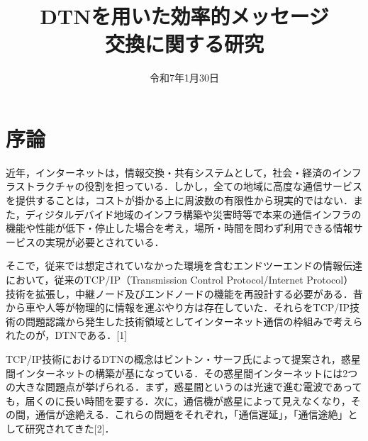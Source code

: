 \documentclass[11pt]{icsthesis}
\title{DTNを用いた効率的メッセージ\\交換に関する研究}
\date{令和7年1月30日}
\begin{document}
\maketitle
\pagestyle{fancy}
\fancyhead[R]{\nouppercase{\fontsize{10.5pt}{0pt}\selectfont\rightmark}}
\fancyhead[L]{\nouppercase{\fontsize{10.5pt}{0pt}\selectfont\leftmark}}
\fancyfoot[C]{--\ \thepage\ --}
\renewcommand{\headrulewidth}{0.3truemm}
\setcounter{tocdepth}{4}
\pagestyle{fancy}
\fancyfoot[C]{--\ \thepage\ --}
{\makeatletter
\let\ps@jpl@in\ps@empty
\makeatother
\pagestyle{plain}
\tableofcontents
\clearpage}

\chapter{序論}
近年，インターネットは，情報交換・共有システムとして，社会・経済のインフラストラクチャの役割を担っている．しかし，全ての地域に高度な通信サービスを提供することは，コストが掛かる上に周波数の有限性から現実的ではない．また，ディジタルデバイド地域のインフラ構築や災害時等で本来の通信インフラの機能や性能が低下・停止した場合を考え，場所・時間を問わず利用できる情報サービスの実現が必要とされている．

そこで，従来では想定されていなかった環境を含むエンドツーエンドの情報伝達において，従来のTCP/IP（Transmission Control Protocol/Internet Protocol）技術を拡張し，中継ノード及びエンドノードの機能を再設計する必要がある．昔から車や人等が物理的に情報を運ぶやり方は存在していた．それらをTCP/IP技術の問題認識から発生した技術領域としてインターネット通信の枠組みで考えられたのが，DTNである．[1]

TCP/IP技術におけるDTNの概念はビントン・サーフ氏によって提案され，惑星間インターネットの構築が基になっている．その惑星間インターネットには2つの大きな問題点が挙げられる．まず，惑星間というのは光速で進む電波であっても，届くのに長い時間を要する．次に，通信機が惑星によって見えなくなり，その間，通信が途絶える．これらの問題をそれぞれ，「通信遅延」，「通信途絶」として研究されてきた[2]．
\end{document}
